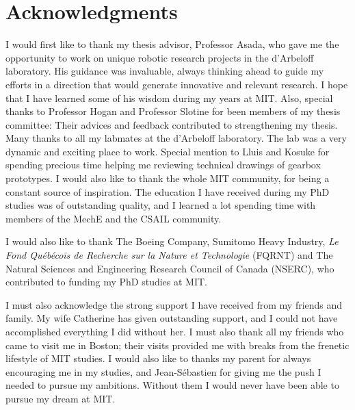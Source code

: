 \section*{Acknowledgments}


I would first like to thank my thesis advisor, Professor Asada, who gave me the opportunity to work on unique robotic research projects in the d'Arbeloff laboratory. His guidance was invaluable, always thinking ahead to guide my efforts in a direction that would generate innovative and relevant research. I hope that I have learned some of his wisdom during my years at MIT. Also, special thanks to Professor Hogan and Professor Slotine for been members of my thesis committee: Their advices and feedback contributed to strengthening my thesis. Many thanks to all my labmates at the d'Arbeloff laboratory. The lab was a very dynamic and exciting place to work. Special mention to Lluis and Kosuke for spending precious time helping me reviewing technical drawings of gearbox prototypes. I would also like to thank the whole MIT community, for being a constant source of inspiration. The education I have received during my PhD studies was of outstanding quality, and I learned a lot spending time with members of the MechE and the CSAIL community.

I would also like to thank The Boeing Company, Sumitomo Heavy Industry, \textit{Le Fond Qu\'{e}b\'{e}cois de Recherche sur la Nature et Technologie} (FQRNT) and The Natural Sciences and Engineering Research Council of Canada (NSERC), who contributed to funding my PhD studies at MIT.

I must also acknowledge the strong support I have received from my friends and family. My wife Catherine has given outstanding support, and I could not have accomplished everything I did without her. I must also thank all my friends who came to visit me in Boston; their visits provided me with breaks from the frenetic lifestyle of MIT studies. I would also like to thanks my parent for always encouraging me in my studies, and Jean-S\'{e}bastien for giving me the push I needed to pursue my ambitions. Without them I would never have been able to pursue my dream at MIT. 
